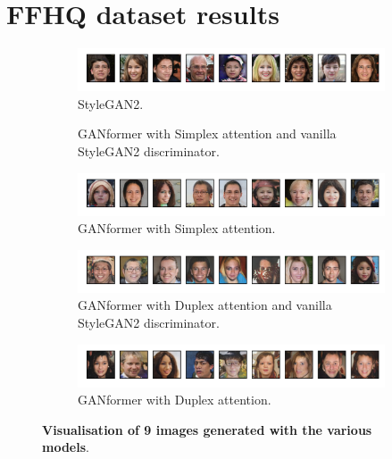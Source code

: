 \documentclass{article}
\begin{document}
\section{FFHQ dataset results} \label{sec:ffhq-results}
\begin{figure}[htpb]
	\centering
	\begin{subfigure}{\linewidth}
		\includegraphics[width=\linewidth]{ffhq-random_Stylegan2.png}
		\vspace{-7mm}
		\caption{StyleGAN2.} 
	\end{subfigure}
	\begin{subfigure}{\linewidth}
		\vspace{-7mm}
		\caption{GANformer with Simplex attention and vanilla StyleGAN2 discriminator.}
	\end{subfigure}
	\begin{subfigure}{\linewidth}
		\includegraphics[width=\linewidth]{ffhq-random_GANFormerSimplexAtt.png}
		\vspace{-7mm}
		\caption{GANformer with Simplex attention.}
	\end{subfigure}
	\begin{subfigure}{\linewidth}
		\includegraphics[width=\linewidth]{ffhq-random_GANFormerDuplexNoAtt.png}
		\vspace{-7mm}
		\caption{GANformer with Duplex attention and vanilla StyleGAN2 discriminator.}
	\end{subfigure}
	\begin{subfigure}{\linewidth}
		\includegraphics[width=\linewidth]{ffhq-random_GANFormerDuplexAtt.png}
		\vspace{-7mm}
		\caption{GANformer with Duplex attention.}
	\end{subfigure}
	\vspace{3mm}
	\caption{\textbf{Visualisation of 9 images generated with the various models}.}\label{fig:random-ffhq}
\end{figure}
\end{document}
